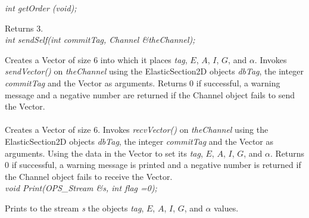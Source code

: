 {\em int getOrder (void); } 

Returns 3. \\

{\em    int sendSelf(int commitTag, Channel \&theChannel); }

Creates a Vector of size $6$ into which it places  {\em tag},
$E$, $A$, $I$, $G$, and $\alpha$. Invokes {\em sendVector()} on  {\em theChannel} using the
ElasticSection2D objects {\em dbTag}, the integer {\em commitTag} and
the Vector as arguments. Returns $0$ if successful, a warning message
and a negative number are returned if the Channel object fails to send
the Vector. \\

\\
Creates a Vector of size $6$. Invokes {\em recvVector()} on  {\em
theChannel} using the ElasticSection2D objects {\em dbTag}, the integer
{\em commitTag} and the Vector as arguments. Using the data in the
Vector to set its {\em tag}, $E$, $A$, $I$, $G$, and $\alpha$. Returns $0$ if successful, a
warning message is printed and a negative number is returned if the Channel 
object fails to receive the Vector. \\

{\em    void Print(OPS_Stream \&s, int flag =0);} 

Prints to the stream {\em s} the objects {\em tag}, $E$, $A$, $I$, $G$, and
$\alpha$ values. \\




